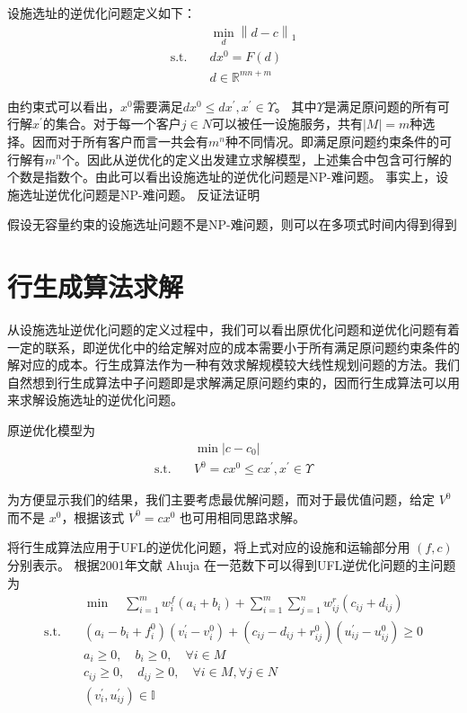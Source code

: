 \documentclass[UTF8]{article}
\begin{document}
设施选址的逆优化问题定义如下：
\begin{align*}
&\min_{d} \left\|d-c\right\|_1 \\
\text{s.t.}\quad & dx^0 = F(d) \\
& d \in \mathbb{R}^{mn+m}
\end{align*}

由约束式可以看出，$x^0$需要满足$dx^0 \leq dx^{'}, x^{'} \in \Upsilon$。 其中$\Upsilon$是满足原问题的所有可行解$x^{'}$的集合。对于每一个客户$j \in N$可以被任一设施服务，共有$|M|=m$种选择。因而对于所有客户而言一共会有$m^n$种不同情况。即满足原问题约束条件的可行解有$m^n$个。因此从逆优化的定义出发建立求解模型，上述集合中包含可行解的个数是指数个。由此可以看出设施选址的逆优化问题是NP-难问题。
事实上，设施选址逆优化问题是NP-难问题。
反证法证明

假设无容量约束的设施选址问题不是NP-难问题，则可以在多项式时间内得到得到



\section{行生成算法求解}
从设施选址逆优化问题的定义过程中，我们可以看出原优化问题和逆优化问题有着一定的联系，即逆优化中的给定解对应的成本需要小于所有满足原问题约束条件的解对应的成本。行生成算法作为一种有效求解规模较大线性规划问题的方法。我们自然想到行生成算法中子问题即是求解满足原问题约束的，因而行生成算法可以用来求解设施选址的逆优化问题。

原逆优化模型为
\begin{align*}
&\min |c-c_0|  \\
\text{s.t.}\quad & V^0 = cx^0 \leq cx^{'}, x^{'} \in \Upsilon
\end{align*}


为方便显示我们的结果，我们主要考虑最优解问题，而对于最优值问题，给定 $V^0$ 而不是 $x^0$，根据该式 $V^0 = cx^0$ 也可用相同思路求解。

将行生成算法应用于UFL的逆优化问题，将上式对应的设施和运输部分用 $(f,c)$ 分别表示。
根据2001年文献 Ahuja 在一范数下可以得到UFL逆优化问题的主问题为
\begin{align*}
&\min \quad \sum_{i=1}^m w_i^f(a_i+b_i)+\sum_{i=1}^m\sum_{j=1}^n w_{ij}^r(c_{ij}+d_{ij})\\
\text{s.t.}\quad & (a_i-b_i+f_i^0)(v_i^{'}-v_i^{0}) + (c_{ij}-d_{ij}+r_{ij}^0)(u_{ij}^{'}-u_{ij}^{0})  \geq 0 \\
& a_i \geq 0 ,\quad b_i \geq 0,\quad \forall i \in M \\
& c_{ij} \geq 0, \quad d_{ij} \geq 0, \quad \forall i \in M, \forall j \in N\\
& (v_i^{'},u_{ij}^{'}) \in \mathbb{I}
\end{align*}
\end{document}
